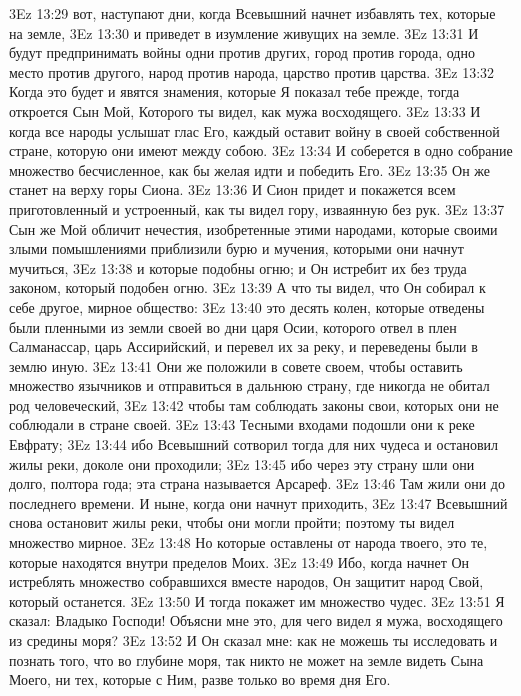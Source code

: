 \vs 3Ez 13:29 вот, наступают дни, когда Всевышний начнет избавлять тех, которые на земле,
\vs 3Ez 13:30 и приведет в изумление живущих на земле.
\vs 3Ez 13:31 И будут предпринимать войны одни против других, город против города, одно место против другого, народ против народа, царство против царства.
\vs 3Ez 13:32 Когда это будет и явятся знамения, которые Я показал тебе прежде, тогда откроется Сын Мой, Которого ты видел, как мужа восходящего.
\vs 3Ez 13:33 И когда все народы услышат глас Его, каждый оставит войну в своей собственной стране, которую они имеют между собою.
\vs 3Ez 13:34 И соберется в одно собрание множество бесчисленное, как бы желая идти и победить Его.
\vs 3Ez 13:35 Он же станет на верху горы Сиона.
\vs 3Ez 13:36 И Сион придет и покажется всем приготовленный и устроенный, как ты видел гору, изваянную без рук.
\vs 3Ez 13:37 Сын же Мой обличит нечестия, изобретенные этими народами, которые своими злыми помышлениями приблизили бурю и мучения, которыми они начнут мучиться,
\vs 3Ez 13:38 и которые подобны огню; и Он истребит их без труда законом, который подобен огню.
\vs 3Ez 13:39 А что ты видел, что Он собирал к себе другое, мирное общество:
\vs 3Ez 13:40 это десять колен, которые отведены были пленными из земли своей во дни царя Осии, которого отвел в плен Салманассар, царь Ассирийский, и перевел их за реку, и переведены были в землю иную.
\vs 3Ez 13:41 Они же положили в совете своем, чтобы оставить множество язычников и отправиться в дальнюю страну, где никогда не обитал род человеческий,
\vs 3Ez 13:42 чтобы там соблюдать законы свои, которых они не соблюдали в стране своей.
\vs 3Ez 13:43 Тесными входами подошли они к реке Евфрату;
\vs 3Ez 13:44 ибо Всевышний сотворил тогда для них чудеса и остановил жилы реки, доколе они проходили;
\vs 3Ez 13:45 ибо через эту страну шли они долго, полтора года; эта страна называется Арсареф.
\vs 3Ez 13:46 Там жили они до последнего времени. И ныне, когда они начнут приходить,
\vs 3Ez 13:47 Всевышний снова остановит жилы реки, чтобы они могли пройти; поэтому ты видел множество мирное.
\vs 3Ez 13:48 Но которые оставлены от народа твоего, это те, которые находятся внутри пределов Моих.
\vs 3Ez 13:49 Ибо, когда начнет Он истреблять множество собравшихся вместе народов, Он защитит народ Свой, который останется.
\vs 3Ez 13:50 И тогда покажет им множество чудес.
\vs 3Ez 13:51 Я сказал: Владыко Господи! Объясни мне это, для чего видел я мужа, восходящего из средины моря?
\vs 3Ez 13:52 И Он сказал мне: как не можешь ты исследовать и познать того, что во глубине моря, так никто не может на земле видеть Сына Моего, ни тех, которые с Ним, разве только во время дня Его.

